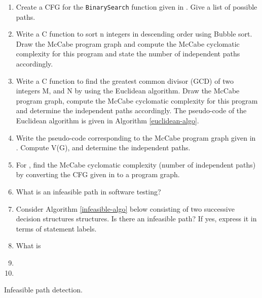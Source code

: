 \begin{enumerate}
    \item Create a CFG for the \lstinline!BinarySearch! function given in . Give a list of possible paths.
    \item Write a C function to sort n integers in descending order using Bubble sort. Draw the McCabe program graph and compute the McCabe cyclomatic complexity for this program and state the number of independent paths accordingly.
    \item Write a C function to find the greatest common divisor (GCD) of two integers M, and N by using the Euclidean algorithm. Draw the McCabe program graph, compute the McCabe cyclomatic complexity for this program and determine the independent paths accordingly.
    The pseudo-code of the Euclidean algorithm is given in Algorithm \ref{euclidean-algo}.
    \item Write the pseudo-code corresponding to the McCabe program graph given in . Compute V(G), and determine the independent paths.
    \item For , find the McCabe cyclomatic complexity (number of independent paths) by converting the CFG given in  to a program graph.
    \item What is an infeasible path in software testing?
    \item Consider Algorithm \ref{infeasible-algo} below consisting of two successive decision structures structures. Is there an infeasible path? If yes, express it in terms of statement labels.
    \item What is
    \item
    \item
\end{enumerate}

\begin{algorithm}
\DontPrintSemicolon
{}
\caption{Infeasible path detection.}
\label{infeasible-algo}
\end{algorithm}

